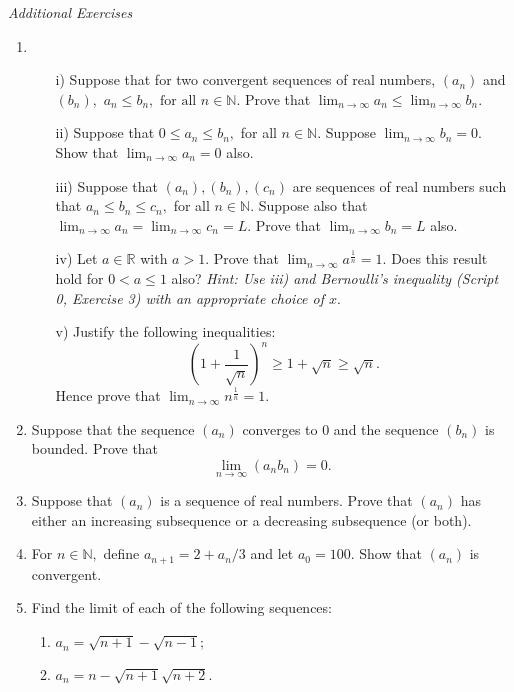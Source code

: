 \documentclass[openany, amssymb, psamsfonts]{amsart}
\newcommand{\bbN}{\mathbb{N}}
\newcommand{\bbR}{\mathbb{R}}
\theoremstyle{definition}
\numberwithin{equation}{section}
\begin{document}
\begin{center}
{\em Additional Exercises}
\end{center}

\begin{enumerate}

\item
\begin{enumerate}
\item[i)] Suppose that for two convergent sequences of real numbers, $(a_n)$ and $(b_n),$ 
$  a_n \leq b_n, \text{ for all } n\in \bbN. $
 Prove that $ \lim_{n\to\infty} a_n \leq \lim_{n\to\infty}b_n.$
\item[ii)] Suppose that $0\leq a_n\leq b_n,$ for all $n\in\bbN.$ Suppose $\lim_{n\to\infty} b_n=0.$ Show that $\lim_{n\to\infty} a_n=0$ also. 
\item[iii)] Suppose that $(a_n), (b_n), (c_n)$ are sequences of real numbers such that $a_n\leq b_n\leq c_n,$ for all $n\in \bbN.$ Suppose also that $\lim_{n\to\infty} a_n = \lim_{n\to\infty} c_n = L.$ Prove that $\lim_{n\to\infty} b_n = L$ also.
\item[iv)] Let $a\in\bbR$ with $a>1.$ Prove that $\displaystyle \lim_{n\to\infty} a^{\frac{1}{n}}=1.$ Does this result hold for $0<a\leq 1$ also? 
{\em Hint: Use iii) and Bernoulli's inequality (Script 0, Exercise 3) with an appropriate choice of $x.$}
\item[v)] Justify the following inequalities:
$$\left(1+\frac{1}{\sqrt{n}}\right)^n\geq 1+\sqrt{n}\geq \sqrt{n}.$$
Hence prove that $\lim_{n\to \infty} n^{\frac{1}{n}}=1.$

\end{enumerate}

\item
Suppose that the sequence $(a_n)$ converges to $0$  and the sequence $(b_n)$ is bounded. Prove that 
$$ 
\lim_{n\to\infty} (a_n b_n)=0.
$$ 



\item Suppose that $(a_n)$ is a sequence of real numbers. Prove that $(a_n)$ has either an increasing subsequence or a decreasing subsequence (or both).


\item For $n\in\bbN,$ define $a_{n+1}=2+a_n/3$ and let $a_0=100.$ Show that $(a_n)$ is convergent.

\item Find the limit of each of the following sequences:
\begin{enumerate}
\item $a_n=\sqrt{n+1}-\sqrt{n-1};$
\item $a_n=n-\sqrt{n+1}\sqrt{n+2}.$
\end{enumerate}


\end{enumerate}
\end{document}
